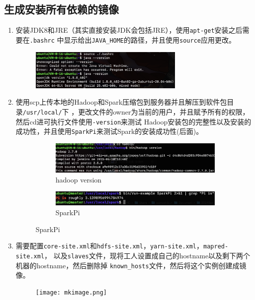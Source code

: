 \documentclass{article}
\begin{document}
\subsection{生成安装所有依赖的镜像}
\begin{enumerate}
    \item 安装JDK8和JRE（其实直接安装JDK会包括JRE），使用\texttt{apt-get}安装之后需要在\texttt{.bashrc}
    中显示给出\texttt{JAVA\_HOME}的路径，并且使用\texttt{source}应用更改。
    \begin{figure}[H]
        \centering
        \includegraphics[width=0.7\textwidth]{java.png}
    \end{figure}
    \item 使用scp上传本地的Hadoop和Spark压缩包到服务器并且解压到软件包目录\texttt{/usr/local/}下
    ，更改文件的owner为当前的用户，并且赋予所有的权限，然后cd进可执行文件使用\texttt{-version}来测试
    Hadoop安装包的完整性以及安装的成功性，并且使用\texttt{SparkPi}来测试Spark的安装成功性(后面)。
    \begin{figure}[H]
        \begin{subfigure}{0.6\textwidth}
            \centering
            \includegraphics[width=\textwidth]{hadoopinstall.png}
            \caption*{hadoop version}
        \end{subfigure}
        \hfill
        \begin{subfigure}{0.35\textwidth}
            \centering
            \includegraphics[width=\textwidth]{sparkpi.png}
            \caption*{SparkPi}
        \end{subfigure}
    \end{figure}
    \item 需要配置\texttt{core-site.xml}和\texttt{hdfs-site.xml}，\texttt{yarn-site.xml}，\texttt{mapred-site.xml}，
    以及\texttt{slaves}文件，现将工人设置成自己的hostname以及剩下两个机器的hostname，然后删除掉
    \texttt{known\_hosts}文件，然后将这个实例创建成镜像。
    \begin{figure}[H]
        \centering
        \texttt{[image: mkimage.png]}
    \end{figure}
    
\end{enumerate}
\end{document}
